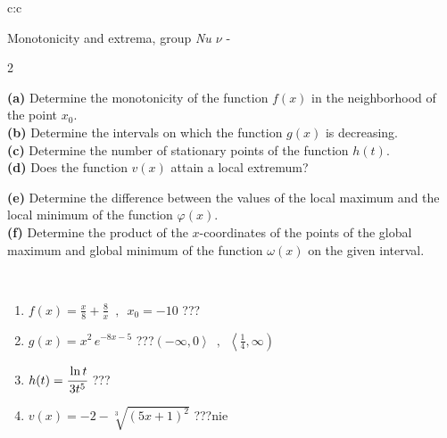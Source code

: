 \documentclass[10pt]{report}
\begin{document}
\begin{tabular}{c:c}
\begin{minipage}[c][104.5mm][t]{0.5\linewidth}
\begin{center}
\vspace{5mm}
{\huge Monotonicity and extrema, group \textit{Nu $\nu$} -}\\[5mm]
\begin{minipage}{0.95\linewidth}
\begin{center}
{\small \begin{multicols}{2} \raggedright
\textbf{(a)} Determine the monotonicity of the function \(f(x)\) in the neighborhood of the point \(x_0\). \\[1mm]
\textbf{(b)} Determine the intervals on which the function \(g(x)\) is decreasing. \\[1mm]
\textbf{(c)} Determine the number of stationary points of the function \(h(t)\). \\[1mm]
\textbf{(d)} Does the function \(v(x)\) attain a local extremum? \par \columnbreak
\textbf{(e)} Determine the difference between the values of the local maximum and the local minimum of the function \(\varphi(x)\). \\[1mm]
\textbf{(f)} Determine the product of the \(x\)-coordinates of the points of the global maximum and global minimum of the function \(\omega(x)\) on the given interval. \\[1mm]
\end{multicols}
}
\end{center}
\end{minipage}
\\[1mm]
\begin{minipage}{0.79\linewidth}
\begin{center}
\begin{varwidth}{\linewidth}
\setlength{\itemsep}{0pt}
\begin{enumerate}
\normalsize
\item $f(x)=\frac{x}{8}+\frac{8}{x} \enspace , \enspace x_0=-10$\quad \dotfill\; ???\;\dotfill \quad {}
\item $g(x)=x^2\, e^{-8x-5}$\quad \dotfill\; ???\;\dotfill \quad $\left(-\infty , 0\right\rangle\enspace , \enspace \left\langle\frac{1}{4} , \infty\right)$
\item $h(t)=\cfrac{\ln t}{3t^5}$\quad \dotfill\; ???\;\dotfill {}
\item $v(x)=-2-\sqrt[3]{(5x+1)^2}$\quad \dotfill\; ???\;\dotfill \quad $\text{nie}$

\end{enumerate}
\end{varwidth}
\end{center}
\end{minipage}
\end{center}
\end{minipage}
\end{tabular}
\end{document}

